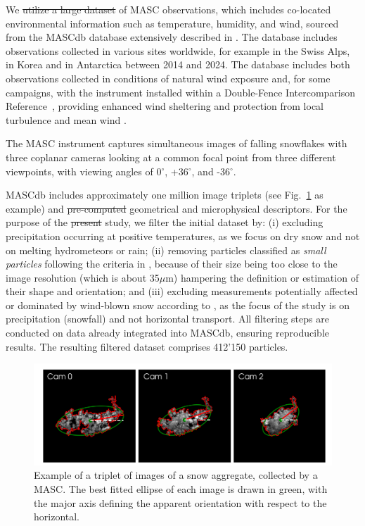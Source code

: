 \documentclass[draft]{agujournal2019}
\providecommand{\DIFadd}[1]{{\protect\color{blue}\uwave{#1}}} %
\providecommand{\DIFdel}[1]{{\protect\color{red}\sout{#1}}}                      %
\providecommand{\DIFaddbegin}{} %
\providecommand{\DIFaddend}{} %
\providecommand{\DIFdelbegin}{} %
\providecommand{\DIFdelend}{} %
\begin{document}
We \DIFdelbegin \DIFdel{utilize a large dataset }\DIFdelend \DIFaddbegin \DIFadd{used a large data set }\DIFaddend of MASC observations, which includes co-located environmental information such as temperature, humidity, and wind, sourced from the MASCdb database extensively described in \cite{Grazioli_SD_2022}. The database includes observations collected in various sites worldwide, for example in the Swiss Alps, in Korea and in Antarctica between 2014 and 2024. The database includes both observations collected in conditions of natural wind exposure and, for some campaigns, with the instrument installed within a Double-Fence Intercomparison Reference~\cite<DFIR, see for example>{Smith_HESS_2020}, providing enhanced wind sheltering and protection from local turbulence and mean wind . 

The MASC instrument captures simultaneous images of falling snowflakes with three coplanar cameras looking at a common focal point from three different viewpoints, with viewing angles of 0$^\circ$, +36$^\circ$, and -36$^\circ$.

MASCdb includes approximately one million image triplets (see Fig.~\ref{fig:triplet} as \DIFaddbegin \DIFadd{an }\DIFaddend example) and \DIFdelbegin \DIFdel{pre-computed }\DIFdelend \DIFaddbegin \DIFadd{precomputed }\DIFaddend geometrical and microphysical descriptors. For the purpose of the \DIFdelbegin \DIFdel{present }\DIFdelend study, we filter the initial dataset by: (i) excluding precipitation occurring at positive temperatures, as we focus on dry snow and not on melting hydrometeors or rain; (ii) removing particles classified as \textit{small particles} following the criteria in \cite{Praz_AMT_2017}, because of their size being too close to the image resolution (which is about 35$\mu$m) hampering the definition or estimation of their shape and orientation; and (iii) excluding measurements potentially affected or dominated by wind-blown snow according to \cite{Schaer_TC_2020}, as the focus of the study is on precipitation (snowfall) and not horizontal transport. All filtering steps are conducted on data already integrated into MASCdb, ensuring reproducible results. The resulting filtered dataset comprises 412'150 particles.

\begin{figure}
 \noindent\includegraphics[width=\textwidth]{Fig01.png}
\caption{Example of a triplet of images of a snow aggregate, collected by a MASC. The best fitted ellipse of each image is drawn in green, with the major axis defining the apparent orientation with respect to the horizontal.    }
\label{fig:triplet}
\end{figure}
\end{document}

